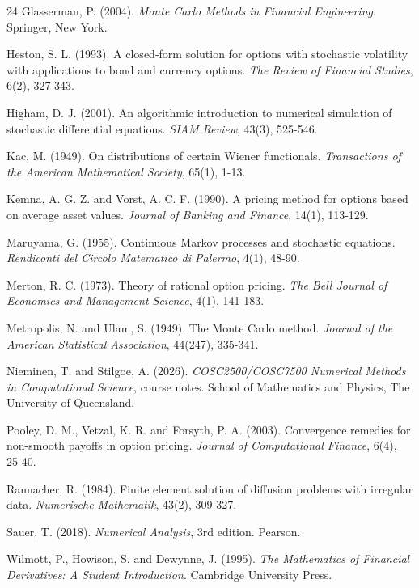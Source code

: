 \documentclass[11pt,a4paper]{article}
\begin{document}
\begin{thebibliography}{24}
Glasserman, P. (2004). \emph{Monte Carlo Methods in Financial Engineering}. Springer, New York.

Heston, S. L. (1993). A closed-form solution for options with stochastic volatility with applications to bond and currency options. \emph{The Review of Financial Studies}, 6(2), 327-343.

Higham, D. J. (2001). An algorithmic introduction to numerical simulation of stochastic differential equations. \emph{SIAM Review}, 43(3), 525-546.

Kac, M. (1949). On distributions of certain Wiener functionals. \emph{Transactions of the American Mathematical Society}, 65(1), 1-13.

Kemna, A. G. Z. and Vorst, A. C. F. (1990). A pricing method for options based on average asset values. \emph{Journal of Banking and Finance}, 14(1), 113-129.

Maruyama, G. (1955). Continuous Markov processes and stochastic equations. \emph{Rendiconti del Circolo Matematico di Palermo}, 4(1), 48-90.

Merton, R. C. (1973). Theory of rational option pricing. \emph{The Bell Journal of Economics and Management Science}, 4(1), 141-183.

Metropolis, N. and Ulam, S. (1949). The Monte Carlo method. \emph{Journal of the American Statistical Association}, 44(247), 335-341.

Nieminen, T. and Stilgoe, A. (2026). \emph{COSC2500/COSC7500 Numerical Methods in Computational Science}, course notes. School of Mathematics and Physics, The University of Queensland.

Pooley, D. M., Vetzal, K. R. and Forsyth, P. A. (2003). Convergence remedies for non-smooth payoffs in option pricing. \emph{Journal of Computational Finance}, 6(4), 25-40.

Rannacher, R. (1984). Finite element solution of diffusion problems with irregular data. \emph{Numerische Mathematik}, 43(2), 309-327.

Sauer, T. (2018). \emph{Numerical Analysis}, 3rd edition. Pearson.

Wilmott, P., Howison, S. and Dewynne, J. (1995). \emph{The Mathematics of Financial Derivatives: A Student Introduction}. Cambridge University Press.

\end{thebibliography}
\end{document}
